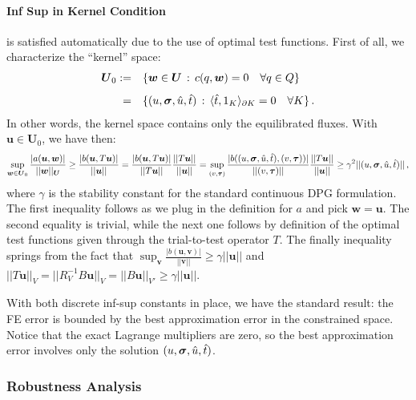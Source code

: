 \documentclass[letterpaper]{article}
\def\bftau{\boldsymbol\tau}
\newcommand{\LRc}[1]{\left\{ #1 \right\}}
\newcommand{\bfsig}{\mbox{\boldmath $\sigma$}}
\newcommand{\bfv}{\boldsymbol v}
\newcommand{\bfu}{\boldsymbol u}
\newcommand{\bfU}{\boldsymbol U}
\newcommand{\bfw}{\boldsymbol w}
\begin{document}
\paragraph{Inf Sup in Kernel Condition} is satisfied automatically due to the use of optimal
test functions. First of all, we characterize the ``kernel'' space:
\begin{equation}
\begin{array}{rl}
\bfU_0  := & \LRc{ \bfw \in \bfU \, : \, c(q,\bfw) = 0 \quad \forall q \in Q} \\[8pt]
 = &\{ (u,\bfsig,\hat{u},\hat{t}) \, : \, \langle \hat{t},1_K \rangle_{\partial K} = 0
 \quad \forall K \}\,.
\end{array}
\end{equation}
In other words, the kernel space contains only the equilibrated fluxes.
With $\bfu \in \bfU_0$, we have then:
\begin{equation}
   \sup_{\bfw \in \bfU_0} \frac{| a(\bfu,\bfw) |}{|| \bfw ||_{\bfU} }
   \geq \frac{| b(\bfu,T \bfu) |}{|| \bfu ||}
   = \frac{| b(\bfu,T \bfu) |}{|| T\bfu ||}\frac{||T\bfu||}{||\bfu||}
   = \sup_{(v,\bftau)}\frac{| b((u,\bfsig,\hat{u},\hat{t}), (v,\bftau)) |}{|| (v,\bftau) ||}
   \frac{||T\bfu||}{||\bfu||}
   \geq \gamma^2 || (u,\bfsig,\hat{u},\hat{t}) ||\,,
\end{equation}
where $\gamma$ is the stability constant for the standard continuous DPG formulation.
The first inequality follows as we plug in the definition for $a$ and pick
$\bfw=\bfu$. The second equality is trivial, while the next one follows by definition of the optimal test
functions given through the trial-to-test operator $T$. The finally inequality
springs from the fact that
$\sup_{\bfv}\frac{|b(\bfu,\bfv)|}{||\bfv||}\geq\gamma||\bfu||$ and
$||T\bfu||_V=||R_V^{-1}B\bfu||_V=||B\bfu||_{V'}\geq\gamma||\bfu||$.

With both discrete inf-sup constants in place, we have the standard result: the FE error
is bounded by the best approximation error in the constrained space. Notice that the exact Lagrange multipliers
are zero, so the best approximation error involves only the solution $(u,\bfsig,\hat{u},\hat{t})$.


\subsubsection{Robustness Analysis}
\label{sec:robustnessAnalysis}
\end{document}
